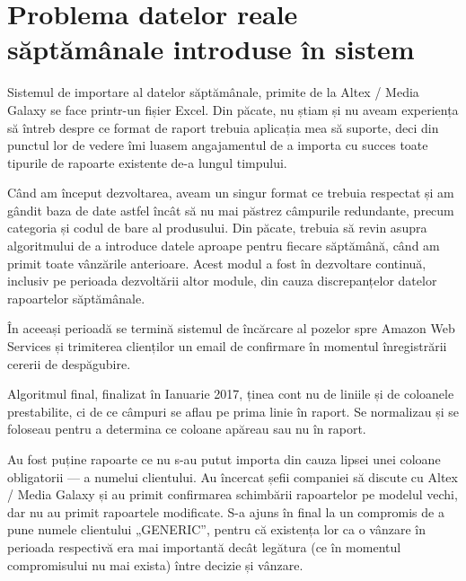 \section{Problema datelor reale săptămânale introduse în sistem}

	Sistemul de importare al datelor săptămânale, primite de la Altex / Media Galaxy se face printr-un fișier Excel.
	Din păcate, nu știam și nu aveam experiența să întreb despre ce format de raport trebuia aplicația mea să suporte, deci din punctul lor de vedere îmi luasem angajamentul de a importa cu succes toate tipurile de rapoarte existente de-a lungul timpului.

	Când am început dezvoltarea, aveam un singur format ce trebuia respectat și am gândit baza de date astfel încât să nu mai păstrez câmpurile redundante, precum categoria și codul de bare al produsului.
	Din păcate, trebuia să revin asupra algoritmului de a introduce datele aproape pentru fiecare săptămână, când am primit toate vânzările anterioare.
	Acest modul a fost în dezvoltare continuă, inclusiv pe perioada dezvoltării altor module, din cauza discrepanțelor datelor rapoartelor săptămânale.

	În aceeași perioadă se termină sistemul de încărcare al pozelor spre Amazon Web Services și trimiterea clienților un email de confirmare în momentul înregistrării cererii de despăgubire.

	Algoritmul final, finalizat în Ianuarie 2017, ținea cont nu de liniile și de coloanele prestabilite, ci de ce câmpuri se aflau pe prima linie în raport.
	Se normalizau și se foloseau pentru a determina ce coloane apăreau sau nu în raport.

	Au fost puține rapoarte ce nu s-au putut importa din cauza lipsei unei coloane obligatorii --- a numelui clientului.
	Au încercat șefii companiei să discute cu Altex / Media Galaxy și au primit confirmarea schimbării rapoartelor pe modelul vechi, dar nu au primit rapoartele modificate.
	S-a ajuns în final la un compromis de a pune numele clientului „GENERIC”, pentru că existența lor ca o vânzare în perioada respectivă era mai importantă decât legătura (ce în momentul compromisului nu mai exista) între decizie și vânzare.
